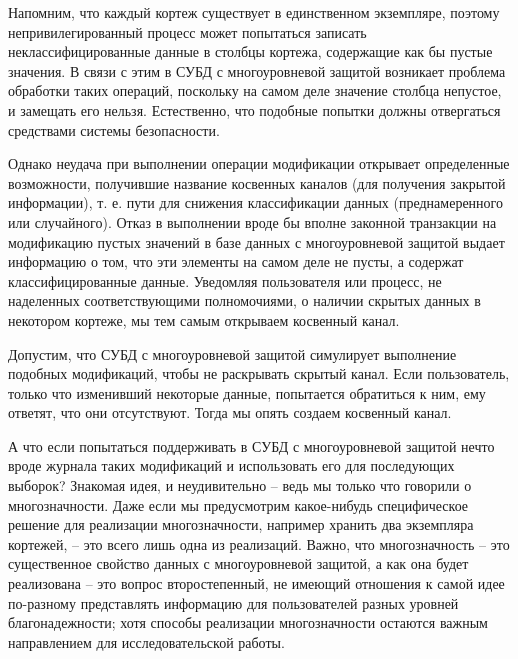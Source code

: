 Напомним, что каждый кортеж существует в единственном экземпляре, поэтому непривилегированный процесс может попытаться записать неклассифицированные данные в столбцы кортежа, содержащие как бы пустые значения. В связи с этим в СУБД с многоуровневой защитой возникает проблема обработки таких операций, поскольку на самом деле значение столбца непустое, и замещать его нельзя. Естественно, что подобные попытки должны отвергаться средствами системы безопасности.

Однако неудача при выполнении операции модификации открывает определенные возможности, получившие название косвенных каналов (для получения закрытой информации), т. е. пути для снижения классификации данных (преднамеренного или случайного). Отказ в выполнении вроде бы вполне законной транзакции на модификацию пустых значений в базе данных с многоуровневой защитой выдает информацию о том, что эти элементы на самом деле не пусты, а содержат классифицированные данные. Уведомляя пользователя или процесс, не наделенных соответствующими полномочиями, о наличии скрытых данных в некотором кортеже, мы тем самым открываем косвенный канал.

Допустим, что СУБД с многоуровневой защитой симулирует выполнение подобных модификаций, чтобы не раскрывать скрытый канал. Если пользователь, только что изменивший некоторые данные, попытается обратиться к ним, ему ответят, что они отсутствуют. Тогда мы опять создаем косвенный канал.

А что если попытаться поддерживать в СУБД с многоуровневой защитой нечто вроде журнала таких модификаций и использовать его для последующих выборок? Знакомая идея, и неудивительно -- ведь мы только что говорили о многозначности. Даже если мы предусмотрим какое-нибудь специфическое решение для реализации многозначности, например хранить два экземпляра кортежей, -- это всего лишь одна из реализаций. Важно, что многозначность -- это существенное свойство данных с многоуровневой защитой, а как она будет реализована -- это вопрос второстепенный, не имеющий отношения к самой идее по-разному представлять информацию для пользователей разных уровней благонадежности; хотя способы реализации многозначности остаются важным направлением для исследовательской работы.

